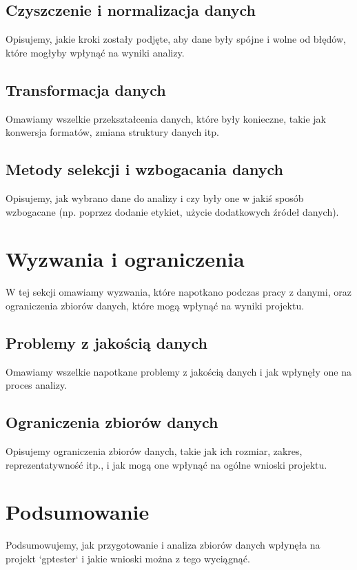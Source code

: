 \subsection{Czyszczenie i normalizacja danych}
Opisujemy, jakie kroki zostały podjęte, aby dane były spójne i wolne od błędów, które mogłyby wpłynąć na wyniki analizy.

\subsection{Transformacja danych}
Omawiamy wszelkie przekształcenia danych, które były konieczne, takie jak konwersja formatów, zmiana struktury danych itp.

\subsection{Metody selekcji i wzbogacania danych}
Opisujemy, jak wybrano dane do analizy i czy były one w jakiś sposób wzbogacane (np. poprzez dodanie etykiet, użycie dodatkowych źródeł danych).

\section{Wyzwania i ograniczenia}
\label{sec:wyzwania_i_ograniczenia}

W tej sekcji omawiamy wyzwania, które napotkano podczas pracy z danymi, oraz ograniczenia zbiorów danych, które mogą wpłynąć na wyniki projektu.

\subsection{Problemy z jakością danych}
Omawiamy wszelkie napotkane problemy z jakością danych i jak wpłynęły one na proces analizy.

\subsection{Ograniczenia zbiorów danych}
Opisujemy ograniczenia zbiorów danych, takie jak ich rozmiar, zakres, reprezentatywność itp., i jak mogą one wpłynąć na ogólne wnioski projektu.

\section{Podsumowanie}
Podsumowujemy, jak przygotowanie i analiza zbiorów danych wpłynęła na projekt `gptester` i jakie wnioski można z tego wyciągnąć.

